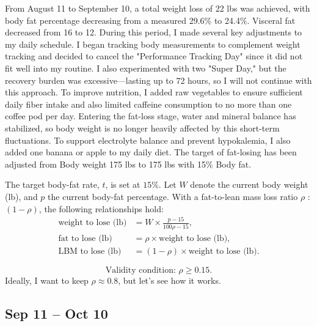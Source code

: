 From August 11 to September 10, a total weight loss of 22 lbs was achieved, with body fat percentage decreasing from a measured 29.6\% to 24.4\%.  Visceral fat decreased from 16 to 12. During this period, I made several key adjustments to my daily schedule. I began tracking body measurements to complement weight tracking and decided to cancel the "Performance Tracking Day" since it did not fit well into my routine. I also experimented with two "Super Day," but the recovery burden was excessive—lasting up to 72 hours, so I will not continue with this approach. To improve nutrition, I added raw vegetables to ensure sufficient daily fiber intake and also limited caffeine consumption to no more than one coffee pod per day. Entering the fat-loss stage, water and mineral balance has stabilized, so body weight is no longer heavily affected by this short-term fluctuations. To support electrolyte balance and prevent hypokalemia, I also added one banana or apple to my daily diet. The target of fat-losing has been adjusted from Body weight 175 lbs to 175 lbs with 15\% Body fat.

\noindent The target body-fat rate, $t$, is set at $15\%$. Let $W$ denote the current body weight (lb), and $p$ the current body-fat percentage. With a fat-to-lean mass loss ratio $\rho$ : $(1-\rho)$, the following relationships hold:
\begin{equation*}
\begin{aligned}
\text{weight to lose (lb)} & =
W \times
\frac{p - 15}{100\rho - 15},\\
\text{fat to lose (lb)} & = \rho \times \text{weight to lose (lb)},\\
\text{LBM to lose (lb)} & = (1-\rho) \times \text{weight to lose (lb)}.
\end{aligned}
\end{equation*}

\begin{equation*}
\text{Validity condition: } \rho \geq 0.15.
\end{equation*}
Ideally, I want to keep $\rho \approx0.8$, but let's see how it works.


\subsection{Sep 11 -- Oct 10}

